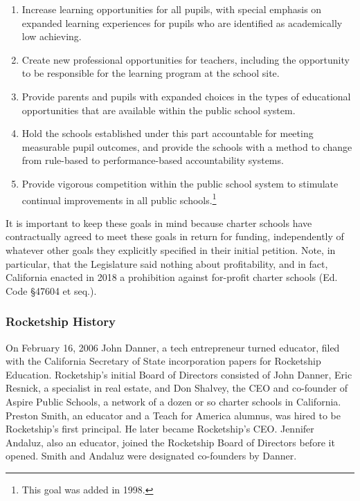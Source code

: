 \begin{enumerate}[label=\alph*)] %
  \item Increase learning opportunities for all pupils, with special emphasis on expanded learning experiences for
  pupils who are identified as academically low achieving.

  \item Create new professional opportunities for teachers, including the opportunity to be responsible for the learning program at the school site.
  \item Provide parents and pupils with expanded choices in the types of educational opportunities that are available within the public school system.
  \item Hold the schools established under this part accountable for meeting measurable pupil outcomes, and provide the schools with a method to change from rule-based to performance-based accountability systems.
  \item Provide vigorous competition within the public school system to stimulate continual improvements in all public schools.\footnote{This goal was added in 1998.}
\end{enumerate}

It is important to keep these goals in mind because charter schools have contractually agreed to meet these goals in return for funding, independently of whatever other goals they explicitly specified in their initial petition. Note, in particular, that the Legislature said nothing about profitability, and in fact, California enacted in 2018 a prohibition against for-profit charter schools (Ed. Code §47604 et seq.).

\subsubsection{Rocketship History}\label{sec:rocketship_history}\indent

On February 16, 2006 John Danner, a tech entrepreneur turned educator, filed with the California Secretary of State incorporation papers for Rocketship Education. Rocketship's initial Board of Directors consisted of John Danner, Eric Resnick, a specialist in real estate, and Don Shalvey, the CEO and co-founder of Aspire Public Schools, a network of a dozen or so charter schools in California. Preston Smith, an educator and a Teach for America alumnus, was hired to be Rocketship's first principal. He later became Rocketship's CEO. Jennifer Andaluz, also an educator, joined the Rocketship Board of Directors before it opened. Smith and Andaluz were designated co-founders by Danner.

